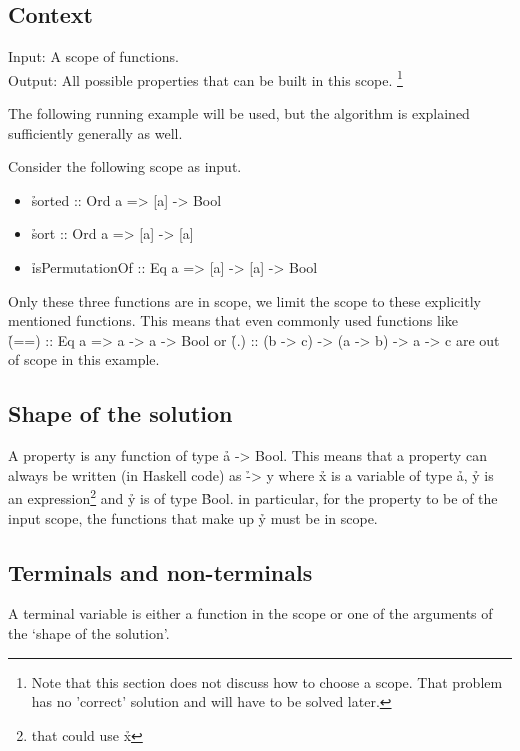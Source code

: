 \documentclass[a4paper, 11pt]{article}
\begin{document}
\subsection{Context}

Input: A scope of functions.\\
Output: All possible properties that can be built in this scope.
\footnote{
  Note that this section does not discuss how to choose a scope.
  That problem has no 'correct' solution and will have to be solved later.
}

The following running example will be used, but the algorithm is explained sufficiently generally as well.

Consider the following scope as input.

\begin{itemize}
  \item \h{sorted :: Ord a => [a] -> Bool}
  \item \h{sort :: Ord a => [a] -> [a]}
  \item \h{isPermutationOf :: Eq a => [a] -> [a] -> Bool}
\end{itemize}

Only these three functions are in scope, we limit the scope to these explicitly mentioned functions.
This means that even commonly used functions like\\ \h{(==) :: Eq a => a -> a -> Bool} or \h{(.) :: (b -> c) -> (a -> b) -> a -> c} are out of scope in this example.


\subsection{Shape of the solution}

A property is any function of type \h{a -> Bool}.
This means that a property can always be written (in Haskell code) as \h{\x -> y} where \h{x} is a variable of type \h{a}, \h{y} is an expression\footnote{that could use \h{x}} and \h{y} is of type \h{Bool}.
in particular, for the property to be of the input scope, the functions that make up \h{y} must be in scope.


\subsection{Terminals and non-terminals}

\begin{de}
  A terminal variable is either a function in the scope or one of the arguments of the `shape of the solution'.
\end{de}
\end{document}
